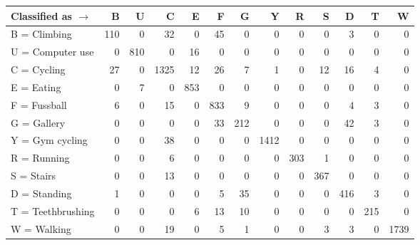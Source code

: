 \begin{tabular}{lrrrrrrrrrrrr}
\toprule
Classified as $\rightarrow$ &    B &    U &     C &    E &    F &    G &     Y &    R &    S &    D &    T &     W \\
\midrule
B = Climbing      &  110 &    0 &    32 &    0 &   45 &    0 &     0 &    0 &    0 &    3 &    0 &     0 \\
U = Computer use  &    0 &  810 &     0 &   16 &    0 &    0 &     0 &    0 &    0 &    0 &    0 &     0 \\
C = Cycling       &   27 &    0 &  1325 &   12 &   26 &    7 &     1 &    0 &   12 &   16 &    4 &     0 \\
E = Eating        &    0 &    7 &     0 &  853 &    0 &    0 &     0 &    0 &    0 &    0 &    0 &     0 \\
F = Fussball      &    6 &    0 &    15 &    0 &  833 &    9 &     0 &    0 &    0 &    4 &    3 &     0 \\
G = Gallery       &    0 &    0 &     0 &    0 &   33 &  212 &     0 &    0 &    0 &   42 &    3 &     0 \\
Y = Gym cycling   &    0 &    0 &    38 &    0 &    0 &    0 &  1412 &    0 &    0 &    0 &    0 &     0 \\
R = Running       &    0 &    0 &     6 &    0 &    0 &    0 &     0 &  303 &    1 &    0 &    0 &     0 \\
S = Stairs        &    0 &    0 &    13 &    0 &    0 &    0 &     0 &    0 &  367 &    0 &    0 &     0 \\
D = Standing      &    1 &    0 &     0 &    0 &    5 &   35 &     0 &    0 &    0 &  416 &    3 &     0 \\
T = Teethbrushing &    0 &    0 &     0 &    6 &   13 &   10 &     0 &    0 &    0 &    0 &  215 &     0 \\
W = Walking       &    0 &    0 &    19 &    0 &    5 &    1 &     0 &    0 &    3 &    3 &    0 &  1739 \\
\bottomrule
\end{tabular}
